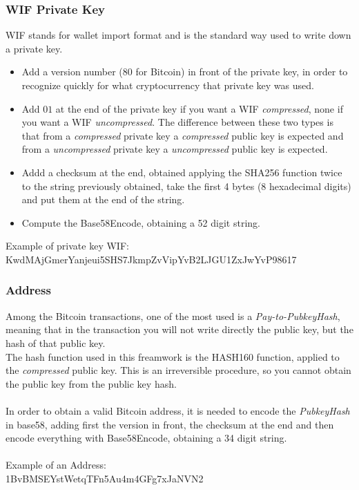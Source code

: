 \subsubsection{WIF Private Key}
WIF stands for wallet import format and is the standard way used to write down a private key.
\begin{itemize}
	\item Add a version number ($80$ for Bitcoin) in front of the private key, in order to recognize quickly for what cryptocurrency that private key was used.
	\item Add $01$ at the end of the private key if you want a WIF \textit{compressed}, none if you want a WIF \textit{uncompressed}. The difference between these two types is that from a \textit{compressed} private key a \textit{compressed} public key is expected and from a \textit{uncompressed} private key a \textit{uncompressed} public key is expected.
	\item Addd a checksum at the end, obtained applying the SHA256 function twice to the string previously obtained, take the first 4 bytes (8 hexadecimal digits) and put them at the end of the string.
	\item Compute the Base58Encode, obtaining a 52 digit string.
\end{itemize}
Example of private key WIF: \\ KwdMAjGmerYanjeui5SHS7JkmpZvVipYvB2LJGU1ZxJwYvP98617

\subsubsection{Address}
Among the Bitcoin transactions, one of the most used is a \textit{Pay-to-PubkeyHash}, meaning that in the transaction you will not write directly the public key, but the hash of that public key.
\\
The hash function used in this freamwork is the HASH160 function, applied to the \textit{compressed} public key. This is an irreversible procedure, so you cannot obtain the public key from the public key hash. \\ \\
In order to obtain a valid Bitcoin address, it is needed to encode the \textit{PubkeyHash} in base58, adding first the version in front, the checksum at the end and then encode everything with Base58Encode, obtaining a 34 digit string. 
\\ \\
Example of an Address: \\
1BvBMSEYstWetqTFn5Au4m4GFg7xJaNVN2



